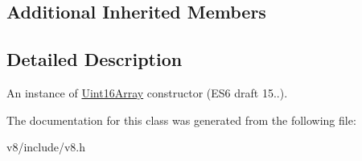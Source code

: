 \subsection*{Additional Inherited Members}


\subsection{Detailed Description}
An instance of \mbox{\hyperlink{classv8_1_1Uint16Array}{Uint16\+Array}} constructor (E\+S6 draft 15..). 

The documentation for this class was generated from the following file\+:\begin{DoxyCompactItemize}
\item 
v8/include/v8.\+h\end{DoxyCompactItemize}
